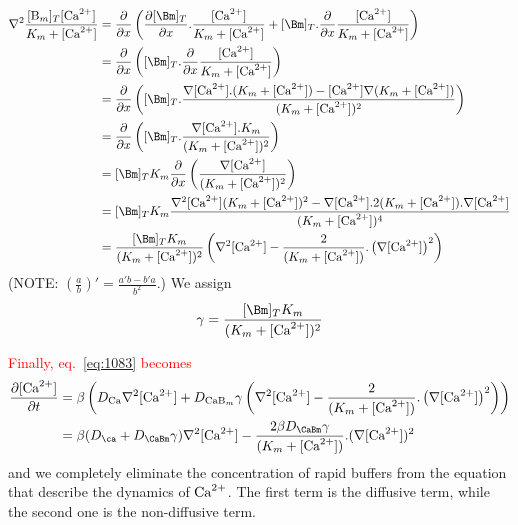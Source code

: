 \begin{equation}
  \label{eq:1084}
  \begin{split}
    \nabla^2 \frac{[\ce{B_m}]_T[\Ca]}{K_m+[\Ca]} &=
    \frac{\partial}{\partial x}\left( \frac{\partial
        [\Bm]_T}{\partial
        x}.\frac{[\Ca]}{K_m+[\Ca]} + [\Bm]_T.\frac{\partial}{\partial
        x}\frac{[\Ca]}{K_m+[\Ca]}\right) \\
    &= \frac{\partial}{\partial x}\left(
      [\Bm]_T.\frac{\partial}{\partial
        x}\frac{[\Ca]}{K_m+[\Ca]}\right) \\
    &= \frac{\partial}{\partial x}\left(
      [\Bm]_T.\frac{\nabla[\Ca].(K_m+[\Ca])-[\Ca]\nabla(K_m+[\Ca])}{(K_m+[\Ca])^2}\right)
    \\
    &= \frac{\partial}{\partial x}\left(
      [\Bm]_T.\frac{\nabla[\Ca].K_m}{(K_m+[\Ca])^2}\right)
    \\
    &= [\Bm]_TK_m \frac{\partial}{\partial x}\left(
      \frac{\nabla[\Ca]}{(K_m+[\Ca])^2}\right)
    \\
    &= [\Bm]_TK_m
    \frac{\nabla^2[\Ca](K_m+[\Ca])^2-\nabla[\Ca].2(K_m+[\Ca]).\nabla[\Ca]}{(K_m+[\Ca])^4}
  \\
  &= \frac{[\Bm]_TK_m}{(K_m+[\Ca])^2}\left(
    \nabla^2[\Ca]-\frac{2}{(K_m+[\Ca])}.\left(\nabla[\Ca]\right)^2 \right)
\\
  \end{split}
\end{equation}
(NOTE: $\left(\frac{a}{b}\right)'=\frac{a'b-b'a}{b^2}$.) We assign
\begin{equation}
  \label{eq:1085}
  \gamma = \frac{[\Bm]_TK_m}{(K_m+[\Ca])^2}
\end{equation}

\textcolor{red}{Finally, eq.~\eqref{eq:1083} becomes}
\begin{equation}
  \label{eq:1086}
  \begin{split}
    \frac{\partial [\Ca]}{\partial t} &=
    \beta\left(D_{\ce{Ca}}\nabla^2[\Ca] + D_{\ce{CaB_m}}\gamma \left(
        \nabla^2[\Ca]-\frac{2}{(K_m+[\Ca])}.\left(\nabla[\Ca]\right)^2\right)\right)
    \\
    &=\beta(D_\ca+D_\CaBm\gamma)\nabla^2[\Ca] - \frac{2\beta D_\CaBm\gamma}{(K_m+[\Ca])}.(\nabla[\Ca])^2
  \end{split}
\end{equation}
and we completely eliminate the concentration of rapid buffers from
the equation that describe the dynamics of ${\text{Ca}^{2+}}$.  The first term is
the diffusive term, while the second one is the non-diffusive term.

